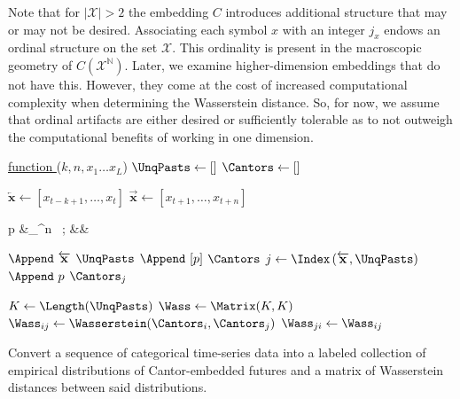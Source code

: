\documentclass[draft,aps,pre,twocolumn,groupaddress,showkeys,nofootinbib,preprintnumbers,floatfix]{revtex4-2}
\begin{document}
Note that for $|\mathcal{X}|>2$ the embedding $C$ introduces additional
structure that may or may not be desired. Associating each symbol $x$ with an
integer $j_x$ endows an ordinal structure on the set $\mathcal{X}$. This
ordinality is present in the macroscopic geometry of
$C\left(\mathcal{X}^{\mathbb{N}}\right)$. Later, we examine higher-dimension
embeddings that do not have this. However, they come at the cost of increased
computational complexity when determining the Wasserstein distance. So, for now,
we assume that ordinal artifacts are either desired or sufficiently tolerable
as to not outweigh the computational benefits of working in one dimension.
\begin{algorithm}[t]
   
  
  \underline{function \CantorWasserstein} ($k,n,x_1\dots x_L$)\;
  $\UnqPasts \leftarrow \left[\right]$\; 
  $\Cantors \leftarrow \left[\right]$\; 
   { 
    $\overleftarrow{\mathbf{x}} \leftarrow \left[x_{t-k+1},\dots, x_{t}\right]$\;
    $\overrightarrow{\mathbf{x}} \leftarrow \left[x_{t+1},\dots, x_{t+n}\right]$\;
      \vspace{-1.5em}
      \begin{flalign*}
        p &\leftarrow \sum_{}^n
        \ ; &&
      \end{flalign*}

       { 
        $\Append\ \overleftarrow{\mathbf{x}}$ \KwTo $\UnqPasts$\; 
        $\Append\ [p]$ \KwTo $\Cantors$\; 
        } { 
        $j \leftarrow \Index\left(\overleftarrow{\mathbf{x}},\UnqPasts\right)$\;
        $\Append\ p$ \KwTo $\Cantors_j$\; 
        } 
  }
  $K \leftarrow \Length(\UnqPasts)$\; 
  $\Wass \leftarrow \Matrix(K,K)$\;
   { 
     {  
      $\Wass_{ij}
        \leftarrow
        \Wasserstein(\Cantors_i,\Cantors_j)$\;
        $\Wass_{j i} \leftarrow \Wass_{i j}$\; } } 
  \KwResult{$\UnqPasts$,$\Cantors$,$\Wass$}
\caption{Convert a sequence of categorical time-series data into a labeled
	collection of empirical distributions of Cantor-embedded futures and a
	matrix of Wasserstein distances between said distributions.
	}
\label{alg:cantorwass}
\end{algorithm}
\end{document}
